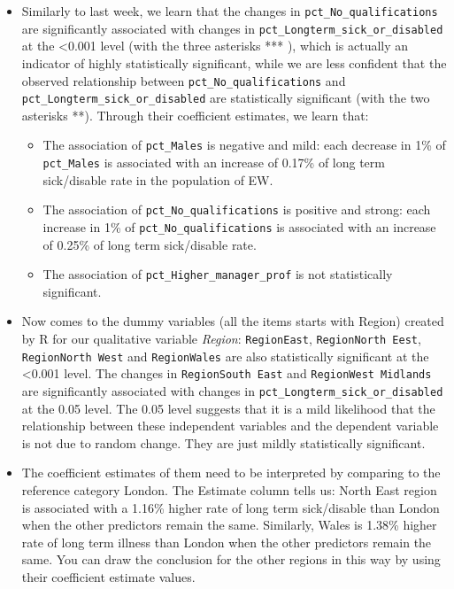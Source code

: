 \documentclass[
  letterpaper,
  DIV=11,
  numbers=noendperiod]{scrreprt}
\begin{document}
\begin{itemize}
\item
  Similarly to last week, we learn that the changes in
  \texttt{pct\_No\_qualifications} are significantly associated with
  changes in \texttt{pct\_Longterm\_sick\_or\_disabled} at the
  \textless0.001 level (with the three asterisks *** ), which is
  actually an indicator of highly statistically significant, while we
  are less confident that the observed relationship between
  \texttt{pct\_No\_qualifications} and
  \texttt{pct\_Longterm\_sick\_or\_disabled} are statistically
  significant (with the two asterisks **). Through their coefficient
  estimates, we learn that:

  \begin{itemize}
  \item
    The association of \texttt{pct\_Males} is negative and mild: each
    decrease in 1\% of \texttt{pct\_Males} is associated with an
    increase of 0.17\% of long term sick/disable rate in the population
    of EW.
  \item
    The association of \texttt{pct\_No\_qualifications} is positive and
    strong: each increase in 1\% of \texttt{pct\_No\_qualifications} is
    associated with an increase of 0.25\% of long term sick/disable
    rate.
  \item
    The association of \texttt{pct\_Higher\_manager\_prof} is not
    statistically significant.
  \end{itemize}
\item
  Now comes to the dummy variables (all the items starts with Region)
  created by R for our qualitative variable \emph{Region}:
  \texttt{RegionEast}, \texttt{RegionNorth\ Eest},
  \texttt{RegionNorth\ West} and \texttt{RegionWales} are also
  statistically significant at the \textless0.001 level. The changes in
  \texttt{RegionSouth\ East} and \texttt{RegionWest\ Midlands} are
  significantly associated with changes in
  \texttt{pct\_Longterm\_sick\_or\_disabled} at the 0.05 level. The 0.05
  level suggests that it is a mild likelihood that the relationship
  between these independent variables and the dependent variable is not
  due to random change. They are just mildly statistically significant.
\item
  The coefficient estimates of them need to be interpreted by comparing
  to the reference category London. The Estimate column tells us: North
  East region is associated with a 1.16\% higher rate of long term
  sick/disable than London when the other predictors remain the same.
  Similarly, Wales is 1.38\% higher rate of long term illness than
  London when the other predictors remain the same. You can draw the
  conclusion for the other regions in this way by using their
  coefficient estimate values.


\end{itemize}
\end{document}
